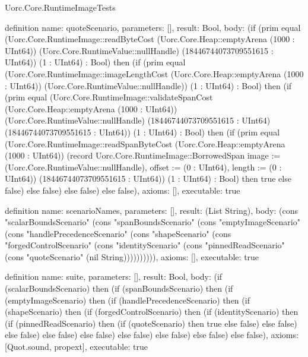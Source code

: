 \begin{lexlean}{Uorc.Core.RuntimeImageTests}
\begin{semanticmodule}
definition{
  name: quoteScenario,
  parameters: [],
  result: Bool,
  body: (if (prim equal (Uorc.Core.RuntimeImage::readByteCost (Uorc.Core.Heap::emptyArena (1000 : UInt64)) (Uorc.Core.RuntimeValue::nullHandle) (18446744073709551615 : UInt64)) (1 : UInt64) : Bool) then (if (prim equal (Uorc.Core.RuntimeImage::imageLengthCost (Uorc.Core.Heap::emptyArena (1000 : UInt64)) (Uorc.Core.RuntimeValue::nullHandle)) (1 : UInt64) : Bool) then (if (prim equal (Uorc.Core.RuntimeImage::validateSpanCost (Uorc.Core.Heap::emptyArena (1000 : UInt64)) (Uorc.Core.RuntimeValue::nullHandle) (18446744073709551615 : UInt64) (18446744073709551615 : UInt64)) (1 : UInt64) : Bool) then (if (prim equal (Uorc.Core.RuntimeImage::readSpanByteCost (Uorc.Core.Heap::emptyArena (1000 : UInt64)) (record Uorc.Core.RuntimeImage::BorrowedSpan {image := (Uorc.Core.RuntimeValue::nullHandle), offset := (0 : UInt64), length := (0 : UInt64)}) (18446744073709551615 : UInt64)) (1 : UInt64) : Bool) then true else false) else false) else false) else false),
  axioms: [],
  executable: true
}

definition{
  name: scenarioNames,
  parameters: [],
  result: (List String),
  body: (cons "scalarBoundsScenario" (cons "spanBoundsScenario" (cons "emptyImageScenario" (cons "handlePrecedenceScenario" (cons "shapeScenario" (cons "forgedControlScenario" (cons "identityScenario" (cons "pinnedReadScenario" (cons "quoteScenario" (nil String)))))))))),
  axioms: [],
  executable: true
}

definition{
  name: suite,
  parameters: [],
  result: Bool,
  body: (if (scalarBoundsScenario) then (if (spanBoundsScenario) then (if (emptyImageScenario) then (if (handlePrecedenceScenario) then (if (shapeScenario) then (if (forgedControlScenario) then (if (identityScenario) then (if (pinnedReadScenario) then (if (quoteScenario) then true else false) else false) else false) else false) else false) else false) else false) else false) else false),
  axioms: [Quot.sound, propext],
  executable: true
}
\end{semanticmodule}

\end{lexlean}
